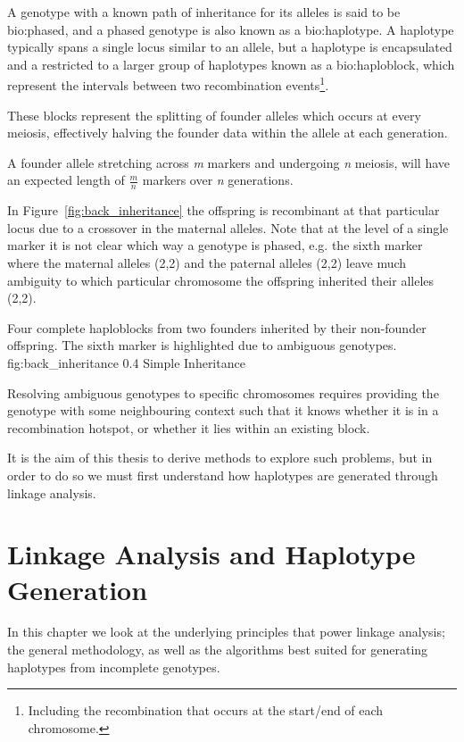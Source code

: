 A genotype with a known path of inheritance for its alleles is said to be \gls{bio:phased}, and a phased genotype is also known as a \gls{bio:haplotype}.  A haplotype typically spans a single locus similar to an allele, but a haplotype is encapsulated and a restricted to a larger group of haplotypes known as a \gls{bio:haploblock}, which represent the intervals between two recombination events\footnote{Including the recombination that occurs at the start/end of each chromosome.}.

These blocks represent the splitting of founder alleles which occurs at every meiosis, effectively halving the founder data within the allele at each generation. 

A founder allele stretching across \textit{m} markers and undergoing \textit{n} meiosis, will have an expected length of \(\frac{m}{n}\) markers over \textit{n} generations.

In Figure~\ref{fig:back_inheritance} the offspring is recombinant at that particular locus due to a crossover in the maternal alleles. Note that at the level of a single marker it is not clear which way a genotype is phased, e.g. the sixth marker where the maternal alleles (2,2) and the paternal alleles (2,2) leave much ambiguity to which particular chromosome the offspring inherited their alleles (2,2).

	{Four complete haploblocks from two founders inherited by their non-founder offspring. The sixth marker is highlighted due to ambiguous genotypes.}
	{fig:back_inheritance}
	{0.4}
	{Simple Inheritance}

Resolving ambiguous genotypes to specific chromosomes requires providing the genotype with some neighbouring context such that it knows whether it is in a recombination hotspot, or whether it lies within an existing block.  

It is the aim of this thesis to derive methods to explore such problems,  but in order to do so we must first understand how haplotypes are generated through linkage analysis.

\section{Linkage Analysis and Haplotype Generation}

In this chapter we look at the underlying principles that power linkage analysis; the general methodology, as well as the algorithms best suited for generating haplotypes from incomplete genotypes.

